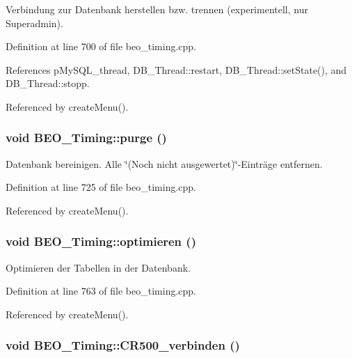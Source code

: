 Verbindung zur Datenbank herstellen bzw. trennen (experimentell, nur Superadmin). 



Definition at line 700 of file beo\_\-timing.cpp.

References pMySQL\_\-thread, DB\_\-Thread::restart, DB\_\-Thread::setState(), and DB\_\-Thread::stopp.

Referenced by createMenu().\hypertarget{class_b_e_o___timing_0736e099c5aa29e7169d74b5cd7da2d7}{
\subsubsection[purge]{\setlength{\rightskip}{0pt plus 5cm}void BEO\_\-Timing::purge ()}}
\label{class_b_e_o___timing_0736e099c5aa29e7169d74b5cd7da2d7}


Datenbank bereinigen. Alle \char`\"{}(Noch nicht ausgewertet)\char`\"{}-Einträge entfernen. 



Definition at line 725 of file beo\_\-timing.cpp.

Referenced by createMenu().\hypertarget{class_b_e_o___timing_85d0de732b79a53566feb1eb636c2886}{
\subsubsection[optimieren]{\setlength{\rightskip}{0pt plus 5cm}void BEO\_\-Timing::optimieren ()}}
\label{class_b_e_o___timing_85d0de732b79a53566feb1eb636c2886}


Optimieren der Tabellen in der Datenbank. 



Definition at line 763 of file beo\_\-timing.cpp.

Referenced by createMenu().\hypertarget{class_b_e_o___timing_6d5901b04efdce11f441205714385160}{
\subsubsection[CR500\_\-verbinden]{\setlength{\rightskip}{0pt plus 5cm}void BEO\_\-Timing::CR500\_\-verbinden ()}}
\label{class_b_e_o___timing_6d5901b04efdce11f441205714385160}


